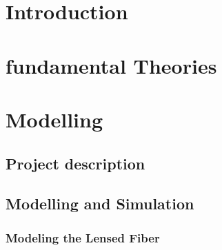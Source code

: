 
\chapter{Introduction}


\chapter{fundamental Theories}
\label{chp:background}
%
%

%

%
%

%

\chapter{Modelling}
\label{chp:model}

\section{Project description}

\section{Modelling and Simulation}

\subsection{Modeling the Lensed Fiber}
\label{sect:model_model_model_TLF}

